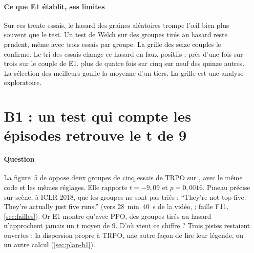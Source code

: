 

\paragraph{Ce que E1 établit, ses limites}
Sur ces trente essais, le hasard des graines aléatoires trompe l'œil bien plus souvent que le test. Un test de
Welch sur des groupes tirés au hasard reste prudent, même avec trois essais par groupe. La grille des seize
couples le confirme. Le tri des essais change ce hasard en faux positifs : près d'une fois sur trois sur le
couple de E1, plus de quatre fois sur cinq sur neuf des quinze autres. La sélection des meilleurs
gonfle la moyenne d'un tiers. La grille est une analyse exploratoire.

\section{B1 : un test qui compte les épisodes retrouve le t de 9}\label{sec:b1}

\paragraph{Question}
La figure~5 de \textcite{henderson2018matters} oppose deux groupes de cinq essais de TRPO sur
, avec le même code et les mêmes réglages. Elle rapporte $t=-9{,}09$ et $p=0{,}0016$. Pineau
précise sur scène, à ICLR 2018, que les groupes ne sont pas triés : \enquote{They're not top five. They're actually just five runs.} (vers 28~min~40~s de la vidéo, \cite{pineau2018iclr} ; faille F11, \cref{sec:failles}). Or E1 montre qu'avec PPO, des groupes tirés au hasard
n'approchent jamais un t moyen de 9. D'où vient ce chiffre ? Trois pistes restaient ouvertes : la dispersion
propre à TRPO, une autre façon de lire leur légende, ou un autre calcul (\cref{sec:plan-b1}).

